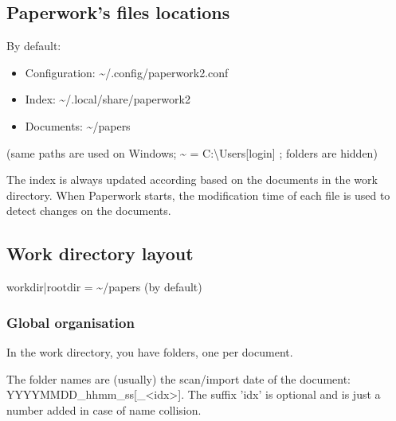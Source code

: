 \documentclass[10pt,a4paper]{article}
\begin{document}
\subsection{Paperwork's files locations}

By default:
\begin{itemize}
\item Configuration: \textasciitilde /.config/paperwork2.conf
\item Index: \textasciitilde /.local/share/paperwork2
\item Documents: \textasciitilde /papers
\end{itemize}
(same paths are used on Windows; \textasciitilde{} = C:\textbackslash Users{[}login{]}
; folders are hidden)

The index is always updated according based on the documents in the
work directory. When Paperwork starts, the modification time of each
file is used to detect changes on the documents.

\subsection{Work directory layout}

workdir|rootdir = \textasciitilde /papers (by default)

\subsubsection{Global organisation}

In the work directory, you have folders, one per document.

The folder names are (usually) the scan/import date of the document:
YYYYMMDD\_hhmm\_ss{[}\_<idx>{]}. The suffix 'idx' is optional and
is just a number added in case of name collision.
\end{document}
